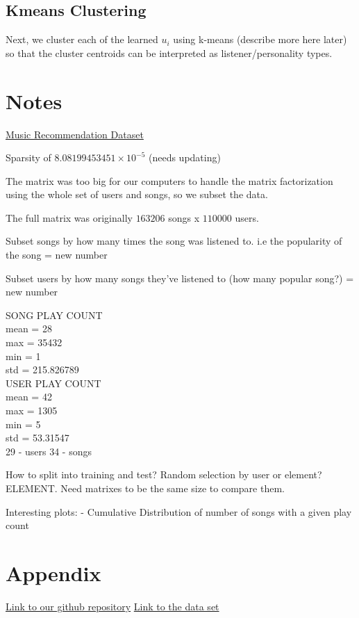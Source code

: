 \documentclass[12pt,preprint]{aastex}
\begin{document}
\subsection{Kmeans Clustering}
Next, we cluster each of the learned $u_i$ using k-means (describe more here later) so that the cluster centroids can be interpreted as listener/personality types.

\section{Notes}

\href{http://www.dtic.upf.edu/~ocelma/MusicRecommendationDataset/}{Music Recommendation Dataset}

Sparsity of $8.08199453451\times 10^{-5}$ (needs updating)

The matrix was too big for our computers to handle the matrix factorization using the whole set of users and songs, so we subset the data. 

The full matrix was originally $163206$ songs x $110000$ users. 

Subset songs by how many times the song was listened to. i.e the popularity of the song
= new number 

Subset users by how many songs they've listened to (how many popular song?)
= new number 

SONG PLAY COUNT  \\
mean = 28 \\
max = 35432 \\
min = 1 \\
std = 215.826789\\

USER PLAY COUNT\\
mean = 42\\
max = 1305\\
min = 5\\
std = 53.31547\\

29 - users
34 - songs 

How to split into training and test? 
Random selection by user or element? ELEMENT. 
Need matrixes to be the same size to compare them.

Interesting plots:
- Cumulative Distribution of number of songs with a given play count


\section{Appendix}
\href{https://github.com/eringrand/musicanalysis}{Link to our github repository} 
\href{http://www.dtic.upf.edu/~ocelma/MusicRecommendationDataset/}{Link to the data set}
\end{document}
